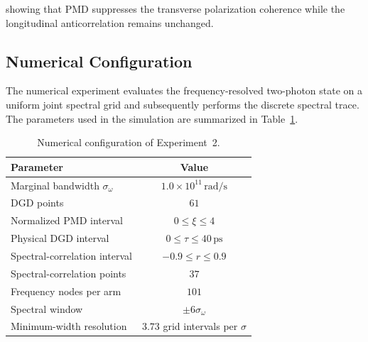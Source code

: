 showing that PMD suppresses the transverse polarization coherence while the
longitudinal anticorrelation remains unchanged.


\subsection{Numerical Configuration}

The numerical experiment evaluates the frequency-resolved two-photon state on a
uniform joint spectral grid and subsequently performs the discrete spectral trace.
The parameters used in the simulation are summarized in
Table~\ref{tab:exp2_numerical_configuration}.

\begin{table}[htbp]
    \centering
    \caption{Numerical configuration of Experiment~2.}
    \label{tab:exp2_numerical_configuration}

    \begin{tabular}{lc}
        \hline
        Parameter & Value
        \\
        \hline

        Marginal bandwidth \(\sigma_\omega\)
        & \(1.0\times10^{11}\,\mathrm{rad/s}\)
        \\

        DGD points
        & \(61\)
        \\

        Normalized PMD interval
        & \(0\leq\xi\leq4\)
        \\

        Physical DGD interval
        & \(0\leq\tau\leq40\,\mathrm{ps}\)
        \\

        Spectral-correlation interval
        & \(-0.9\leq r\leq0.9\)
        \\

        Spectral-correlation points
        & \(37\)
        \\

        Frequency nodes per arm
        & \(101\)
        \\

        Spectral window
        & \(\pm6\sigma_\omega\)
        \\

        Minimum-width resolution
        & \(3.73\) grid intervals per \(\sigma\)
        \\

        \hline
    \end{tabular}
\end{table}

